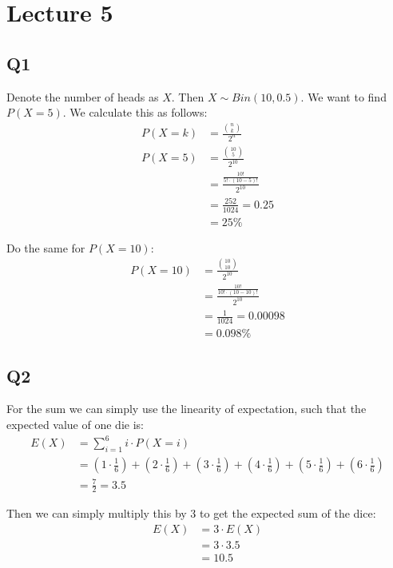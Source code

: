 \section{Lecture 5}
\subsection{Q1}

Denote the number of heads as $X$. Then $X \sim Bin(10, 0.5)$. We want to find $P(X = 5)$. We calculate this as follows:
\begin{align*}
    P(X = k) &= \frac{{n \choose k}}{2^n} \\
    P(X = 5) &= \frac{{10 \choose 5}}{2^{10}} \\
    &= \frac{\frac{10!}{5!\cdot(10-5)!}}{2^10}\\
    &= \frac{252}{1024} = 0.25\\
    &= 25\%
\end{align*}

Do the same for $P(X = 10)$:
\begin{align*}
    P(X = 10) &= \frac{{10 \choose 10}}{2^{10}} \\
    &= \frac{\frac{10!}{10!\cdot(10-10)!}}{2^10}\\
    &= \frac{1}{1024} = 0.00098\\
    &= 0.098\%
\end{align*}

\subsection{Q2}

For the sum we can simply use the linearity of expectation, such that the expected value of one die is:
\begin{align*}
    E(X) &= \sum_{i=1}^6 i \cdot P(X = i) \\
    &= (1 \cdot \frac{1}{6}) + (2 \cdot \frac{1}{6}) + (3 \cdot \frac{1}{6}) + (4 \cdot \frac{1}{6}) + (5 \cdot \frac{1}{6}) + (6 \cdot \frac{1}{6})\\
    &= \frac{7}{2} = 3.5
\end{align*}

Then we can simply multiply this by 3 to get the expected sum of the dice:
\begin{align*}
    E(X) &= 3 \cdot E(X) \\
    &= 3 \cdot 3.5 \\
    &= 10.5
\end{align*}

